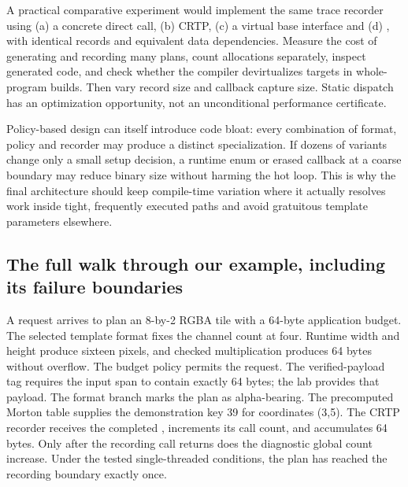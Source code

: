 A practical comparative experiment would implement the same trace recorder using (a) a concrete direct call, (b) CRTP, (c) a virtual base interface and (d) , with identical records and equivalent data dependencies. Measure the cost of generating and recording many plans, count allocations separately, inspect generated code, and check whether the compiler devirtualizes targets in whole-program builds. Then vary record size and callback capture size. Static dispatch has an optimization opportunity, not an unconditional performance certificate.

Policy-based design can itself introduce code bloat: every combination of format, policy and recorder may produce a distinct specialization. If dozens of variants change only a small setup decision, a runtime enum or erased callback at a coarse boundary may reduce binary size without harming the hot loop. This is why the final architecture should keep compile-time variation where it actually resolves work inside tight, frequently executed paths and avoid gratuitous template parameters elsewhere.

\subsection{The full walk through our example, including its failure boundaries}\label{01-foundations-i-ch005-the-full-walk-through-our-example-including-its-failure-boundaries}

\hypertarget{01-foundations-i-ch005-the-full-walk-through-our-example-including-its-failure-boundaries}{}

A request arrives to plan an 8-by-2 RGBA tile with a 64-byte application budget. The selected template format fixes the channel count at four. Runtime width and height produce sixteen pixels, and checked multiplication produces 64 bytes without overflow. The budget policy permits the request. The verified-payload tag requires the input span to contain exactly 64 bytes; the lab provides that payload. The  format branch marks the plan as alpha-bearing. The precomputed Morton table supplies the demonstration key 39 for coordinates (3,5). The CRTP recorder receives the completed , increments its call count, and accumulates 64 bytes. Only after the recording call returns does the diagnostic global count increase. Under the tested single-threaded conditions, the plan has reached the recording boundary exactly once.

